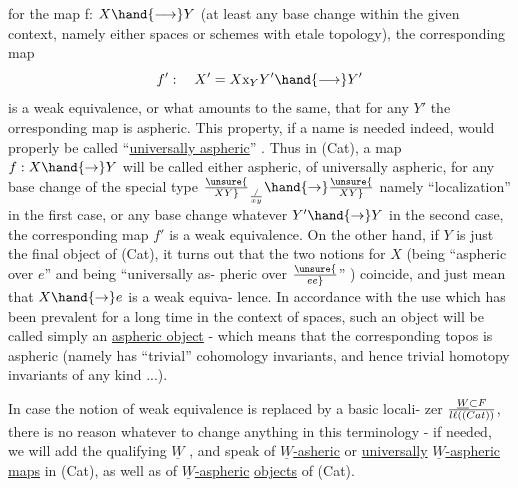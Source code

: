
for the map f: $X\hand{\longrightarrow} Y$ (at least any base change within the given context,
namely either spaces or schemes with etale topology), the corresponding
map 
\[ f' : \quad X'=X\mathrm{x}_{Y}Y'\hand{\longrightarrow} Y' \]
is a weak equivalence, or what amounts to the same, that for any $Y'$ the
orresponding map is aspheric. This property,  if a name is needed
indeed, would properly be called ``\uline{universally aspheric}'' . Thus in (Cat),
a map $f: X\hand{\to}Y$ will be called either aspheric, of universally aspheric,
 for any base change of the special type $\unsure{\over{X}{Y}}_{/\over{x}{y}}\hand{\to}\unsure{\over{X}{Y}}$ namely ``localization''
in the first case, or any base change whatever $Y'\hand{\to}Y$ in the second
case, the corresponding map $f'$ is a weak equivalence. On the other
hand, if $Y$ is just the final object of (Cat), it turns out that the
two notions for $X$ (being ``aspheric over $e$'' and being ``universally as-%
pheric over $\unsure{\over{e}{e}}$'' ) coincide, and just mean that $X\hand{\to}e$ is a weak equiva-%
lence. In accordance with the use which has been prevalent for a long
time\xout{,} in the context of spaces, such an object will be
called simply an \uline{aspheric object} - which means that the corresponding
topos is aspheric (namely has ``trivial'' cohomology invariants, and
hence trivial homotopy invariants of any kind ...).

In case the notion of weak equivalence is replaced by a basic locali-%
zer\xout{,} $\underline{W}\subset F\over{l}{\ell}((Cat))$, there is no reason whatever to change anything in
this terminology -  if needed, we will add the qualifying $\underline{W}$ , and
speak of \uline{$\underline{W}$-asheric} or \uline{universally} \uline{$\underline{W}$-aspheric maps} in (Cat), as well as
of \uline{$\underline{W}$-aspheric} \uline{objects} of (Cat).


